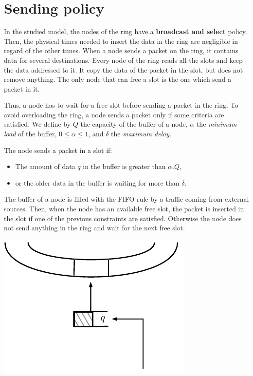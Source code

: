 \documentclass[a4paper,10pt]{article}
\begin{document}
 
 
\section*{Sending policy}
In the studied model, the nodes of the ring have a {\bf broadcast and select} policy. Then, the physical times needed to insert the data in the ring are negligible in regard of the other times.
When a node sends a packet on the ring, it contains data for several destinations. Every node of the ring reads all the slots and keep the data addressed to it. It copy the data of the packet in the slot, but does not remove anything. The only node that can free a slot is the one which send a packet in it.



Thus, a node has to wait for a free slot before sending a packet in the ring. To avoid overloading the ring, a node sends a packet only if some criteria  are satisfied.
We define by $Q$ the capacity of the buffer of a node, $\alpha$ the {\em minimum load} of the buffer, $0 \leq  \alpha \leq 1$, and $\delta$ the {\em maximum delay}.

The node sends a packet in a slot if:
\begin{itemize}
 \item The amount of data $q$ in the buffer is greater than $\alpha . Q$,
 \item or the older data in the buffer is waiting for more than $\delta$.
\end{itemize}

The buffer of a node is filled with the FIFO rule by a traffic coming from external sources. Then, when the node has an available free slot, the packet is inserted in the slot if one of the previous constraints are satisfied. Otherwise the node does not send anything in the ring and wait for the next free slot.

\begin{center}   

      \includegraphics[scale=0.7]{insertion0.pdf}

  
\end{center}
\end{document}
